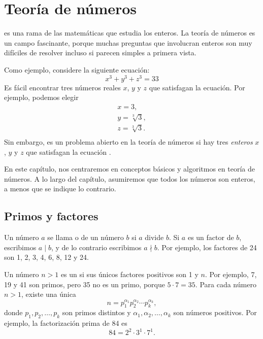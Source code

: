 \chapter{Teoría de números}


 es una rama de las matemáticas
que estudia los enteros.
La teoría de números es un campo fascinante,
porque muchas preguntas que involucran enteros
son muy difíciles de resolver incluso si
parecen simples a primera vista.

Como ejemplo, considere la siguiente ecuación:
\[x^3 + y^3 + z^3 = 33\]
Es fácil encontrar tres números reales $x$, $y$ y $z$
que satisfagan la ecuación.
Por ejemplo, podemos elegir
\[
\begin{array}{lcl}
x = 3, \\
y = \sqrt[3]{3}, \\
z = \sqrt[3]{3}.\\
\end{array}
\]
Sin embargo, es un problema abierto en la teoría de números
si hay tres
\emph{enteros} $x$, $y$ y $z$
que satisfagan la ecuación \cite{bec07}.

En este capítulo, nos centraremos en conceptos básicos
y algoritmos en teoría de números.
A lo largo del capítulo, asumiremos que todos los números
son enteros, a menos que se indique lo contrario.

\section{Primos y factores}


Un número $a$ se llama  o  de un número $b$
si $a$ divide $b$.
Si $a$ es un factor de $b$,
escribimos $a \mid b$, y de lo contrario escribimos $a \nmid b$.
Por ejemplo, los factores de 24 son
1, 2, 3, 4, 6, 8, 12 y 24.


Un número $n>1$ es un 
si sus únicos factores positivos son 1 y $n$.
Por ejemplo, 7, 19 y 41 son primos,
pero 35 no es un primo, porque $5 \cdot 7 = 35$.
Para cada número $n>1$, existe una única
\[ n = p_1^{\alpha_1} p_2^{\alpha_2} \cdots p_k^{\alpha_k},\]
donde $p_1,p_2,\ldots,p_k$ son primos distintos y
$\alpha_1,\alpha_2,\ldots,\alpha_k$ son números positivos.
Por ejemplo, la factorización prima de 84 es
\[84 = 2^2 \cdot 3^1 \cdot 7^1.\]

